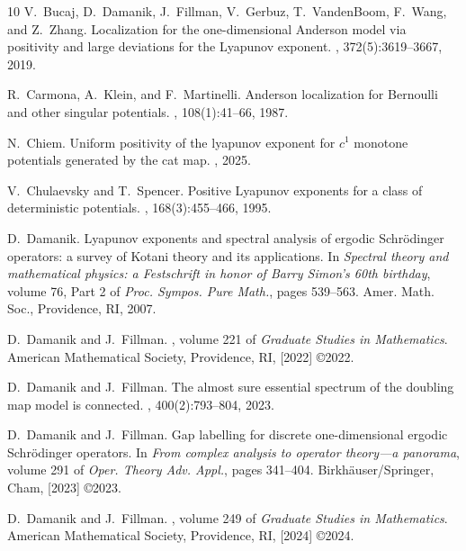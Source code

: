 \documentclass{amsart}
\begin{document}
\begin{thebibliography}{10}
V.~Bucaj, D.~Damanik, J.~Fillman, V.~Gerbuz, T.~VandenBoom, F.~Wang, and Z.~Zhang.
\newblock Localization for the one-dimensional {A}nderson model via positivity and large deviations for the {L}yapunov exponent.
, 372(5):3619--3667, 2019.

R.~Carmona, A.~Klein, and F.~Martinelli.
\newblock Anderson localization for {B}ernoulli and other singular potentials.
, 108(1):41--66, 1987.

N.~Chiem.
\newblock Uniform positivity of the lyapunov exponent for $c^1$ monotone potentials generated by the cat map.
, 2025.

V.~Chulaevsky and T.~Spencer.
\newblock Positive {L}yapunov exponents for a class of deterministic potentials.
, 168(3):455--466, 1995.

D.~Damanik.
\newblock Lyapunov exponents and spectral analysis of ergodic {S}chr\"odinger operators: a survey of {K}otani theory and its applications.
\newblock In {\em Spectral theory and mathematical physics: a {F}estschrift in honor of {B}arry {S}imon's 60th birthday}, volume 76, Part 2 of {\em Proc. Sympos. Pure Math.}, pages 539--563. Amer. Math. Soc., Providence, RI, 2007.

D.~Damanik and J.~Fillman.
, volume 221 of {\em Graduate Studies in Mathematics}.
\newblock American Mathematical Society, Providence, RI, [2022] \copyright 2022.

D.~Damanik and J.~Fillman.
\newblock The almost sure essential spectrum of the doubling map model is connected.
, 400(2):793--804, 2023.

D.~Damanik and J.~Fillman.
\newblock Gap labelling for discrete one-dimensional ergodic {S}chr\"odinger operators.
\newblock In {\em From complex analysis to operator theory---a panorama}, volume 291 of {\em Oper. Theory Adv. Appl.}, pages 341--404. Birkh\"auser/Springer, Cham, [2023] \copyright 2023.

D.~Damanik and J.~Fillman.
, volume 249 of {\em Graduate Studies in Mathematics}.
\newblock American Mathematical Society, Providence, RI, [2024] \copyright 2024.


\end{thebibliography}
\end{document}
